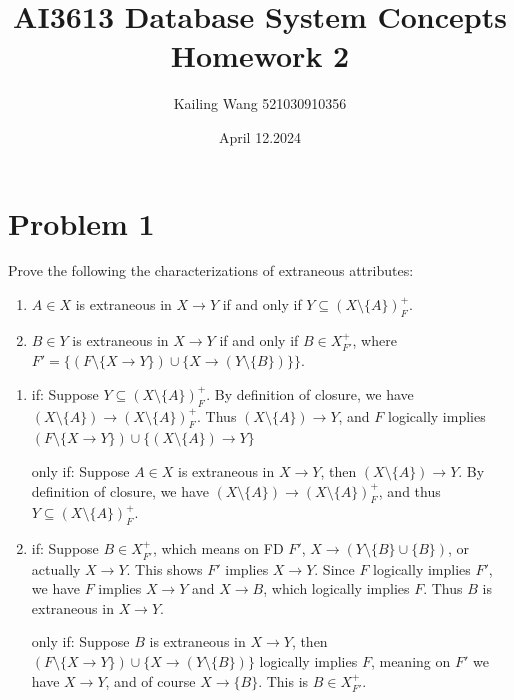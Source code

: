 \documentclass{article}
\begin{document}
\title{AI3613 Database System Concepts Homework 2}
\author{Kailing Wang 521030910356}
\date{April 12.2024}
\maketitle

\section*{Problem 1}
\begin{tcolorbox}[colback=gray!10, breakable]
	Prove the following the characterizations of extraneous attributes:

	\begin{enumerate}
		\item $A \in X$ is extraneous in $X \to Y$ if and only if $Y \subseteq (X \setminus \{A\})_F^+$. 
		\item $B \in Y$ is extraneous in $X \to Y$ if and only if $B \in X_{F'}^+$, where $F' = \{(F \setminus \{X \to Y\}) \cup \{X \to (Y \setminus \{B\})\}\}$.
	\end{enumerate}
\end{tcolorbox}

\begin{enumerate}[1.]
	\item if: Suppose $Y \subseteq (X \setminus \{A\})_F^+$. By definition of closure, we have $(X \setminus \{A\}) \to (X \setminus \{A\})_F^+$. Thus $(X \setminus \{A\}) \to Y$, and $F$ logically implies $(F \setminus \{X \to Y\}) \cup \{(X \setminus \{A\}) \to Y\}$
	
	only if: Suppose $A \in X$ is extraneous in $X \to Y$, then $(X \setminus \{A\}) \to Y$. By definition of closure, we have $(X \setminus \{A\}) \to (X \setminus \{A\})_F^+$, and thus $Y \subseteq (X \setminus \{A\})_F^+$.
	\item if: Suppose $B \in X_{F'}^+$, which means on FD $F'$, $X \to (Y \setminus \{B\}\cup \{B\})$, or actually $X \to Y$. This shows $F'$ implies $X \to Y$. Since $F$ logically implies $F'$, we have $F$ implies $X \to Y$ and $X \to B$, which logically implies $F$. Thus $B$ is extraneous in $X \to Y$.
	
	only if: Suppose $B$ is extraneous in $X \to Y$, then $(F \setminus \{X \to Y\}) \cup \{X \to (Y \setminus \{B\})\}$ logically implies $F$, meaning on $F'$ we have $X \to Y$, and of course $X \to \{B\}$. This is $B \in X_{F'}^+$.
\end{enumerate}
\end{document}
